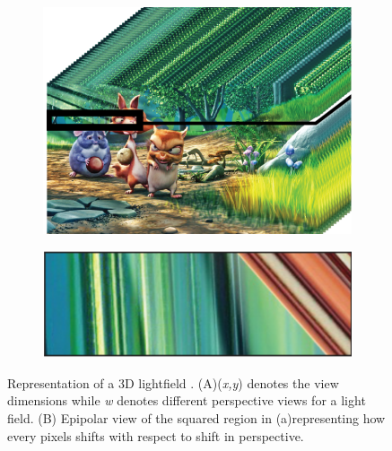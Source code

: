 \begin{figure}[htbp]
    \centering
    \begin{subfigure}[b]{0.48\textwidth}
        \includegraphics[width=\textwidth]{./Template_Figures/lightfield}
        \caption{}\label{fig:lightfield_rep}
    \end{subfigure}
    \begin{subfigure}[b]{0.48\textwidth}
        \includegraphics[width=\textwidth]{./Template_Figures/lightfield_epi}
        \caption{}\label{fig:lightfield_epi}
    \end{subfigure}

    \caption{Representation of a 3D lightfield \cite{du2014improving}. (A)(\emph{x,y}) denotes the view dimensions while \emph{w} denotes different perspective views for a light field. (B) Epipolar view of the squared region in (a)representing how every pixels shifts with respect to shift in perspective.\label{fig:lightfeild}}
\end{figure}
\pagebreak

